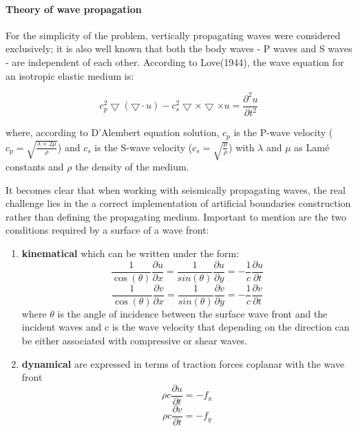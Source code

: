 \paragraph{Theory of wave propagation}
For the simplicity of the problem, vertically propagating waves were considered exclusively; it is also well known that both the body waves - P waves and S waves - are independent of each other. According to Love(1944), the wave equation for an isotropic elastic medium is:

\begin{equation}
c_p^2\bigtriangledown(\bigtriangledown\cdot u) - c_s^2\bigtriangledown \times \bigtriangledown \times u = \frac{\partial^2 u}{\partial t^2}
\end{equation} 

where, according to D'Alembert equation solution, $c_p$ is the P-wave velocity ($c_p=\sqrt{\frac{\lambda + 2 \mu}{\rho}}$) and $c_s$ is the S-wave velocity ($c_s=\sqrt{\frac{\mu}{\rho}}$) with $\lambda$ and $\mu$ as Lamé constants and $\rho$ the density of the medium.

It becomes clear that when working with seismically propagating waves, the real challenge lies in the a correct implementation of artificial boundaries construction rather than defining the propagating medium. Important to mention are the two conditions required by a surface of a wave front:
\begin{enumerate}
	\item \textbf{kinematical} which can be written under the form:
	\begin{equation}
		\frac{1}{\cos(\theta)}\frac{\partial u}{\partial x}= \frac{1}{sin(\theta)}\frac{\partial u}{\partial y} = - \frac{1}{c}\frac{\partial u}{\partial t}
	\end{equation}
		\begin{equation}
		\frac{1}{\cos(\theta)}\frac{\partial v}{\partial x}= \frac{1}{sin(\theta)}\frac{\partial v}{\partial y} = - \frac{1}{c}\frac{\partial v}{\partial t}
	\end{equation}
	 where $\theta$ is the angle of incidence between the surface wave front and the incident waves and c is the wave velocity that depending on the direction can be either associated with compressive or shear waves.
	\item \textbf{dynamical} are expressed in terms of traction forces coplanar with the wave front
	\begin{equation}
		\rho c \frac{\partial u}{\partial t}= - f_x
	\end{equation}
		\begin{equation}
		\rho c \frac{\partial v}{\partial t}= - f_y
		\end{equation}
\end{enumerate} 

